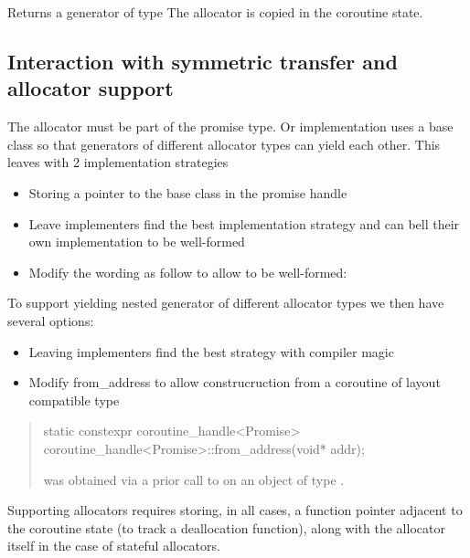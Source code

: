 \documentclass{wg21}
\begin{document}
Returns a generator of type 
The allocator is copied in the coroutine state.


\subsection{Interaction with symmetric transfer and allocator support}

The allocator must be part of the promise type.
Or implementation uses a base class so that generators of different allocator types can yield each other.
This leaves with 2 implementation strategies
\begin{itemize}
\item Storing a pointer to the base class in the promise handle
\item Leave implementers find the best implementation strategy and can bell their own implementation to be well-formed
\item Modify the wording as follow to allow  to be well-formed:
\end{itemize}

To support yielding nested generator of different allocator types we then have several options:
\begin{itemize}
\item Leaving implementers find the best strategy with compiler magic
\item Modify from_address to allow construcruction from a coroutine of layout compatible type
\end{itemize}
\begin{quote}
%
\begin{itemdecl}
static constexpr coroutine_handle<Promise> coroutine_handle<Promise>::from_address(void* addr);
\end{itemdecl}

\begin{itemdescr}
\expects
{} was obtained via a prior call to 
on an object of type \cv {}.
\end{itemdescr}
\end{quote}

Supporting allocators requires storing, in all cases, a function pointer adjacent to the coroutine state (to track a deallocation function),
along with the allocator itself in the case of stateful allocators.
\end{document}
